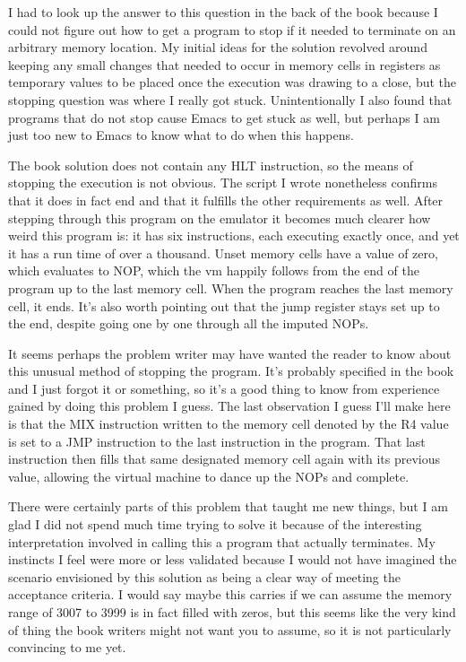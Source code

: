 \documentclass{article}
\begin{document}
I had to look up the answer to this question in the back of the book because
I could not figure out how to get a program to stop if it needed to terminate
on an arbitrary memory location. My initial ideas for the solution revolved
around keeping any small changes that needed to occur in memory cells in
registers as temporary values to be placed once the execution was drawing
to a close, but the stopping question was where I really got stuck. Unintentionally
I also found that programs that do not stop cause Emacs to get stuck as well,
but perhaps I am just too new to Emacs to know what to do when this happens.

\par

The book solution does not contain any HLT instruction, so the means of stopping
the execution is not obvious.  The script I wrote nonetheless confirms that it
does in fact end and that it fulfills the other requirements as well.  After stepping through
this program on the emulator it becomes much clearer how weird this program is:
it has six instructions, each executing exactly once, and yet it has a run time 
of over a thousand.  Unset memory cells have a value of zero, which evaluates to
NOP, which the vm happily follows from the end of the program up to the last
memory cell.  When the program reaches the last memory cell, it ends.  It's also
worth pointing out that the jump register stays set up to the end, despite going
one by one through all the imputed NOPs.

\par

It seems perhaps the problem writer may have wanted the reader to know about this 
unusual method of stopping the program.  It's probably specified in the book and
I just forgot it or something, so it's a good thing to know from experience gained
by doing this problem I guess.  The last observation I guess I'll make here is
that the MIX instruction written to the memory cell denoted by the R4 value is set
to a JMP instruction to the last instruction in the program.  That last instruction 
then fills that same designated memory cell again with its previous value, allowing
the virtual machine to dance up the NOPs and complete.

\par

There were certainly parts of this problem that taught me new things, but I am glad I
did not spend much time trying to solve it because of the interesting interpretation
involved in calling this a program that actually terminates.  My instincts I feel
were more or less validated because I would not have imagined the scenario envisioned
by this solution as being a clear way of meeting the acceptance criteria.  I would say
maybe this carries if we can assume the memory range of 3007 to 3999 is in fact filled
with zeros, but this seems like the very kind of thing the book writers might not want
you to assume, so it is not particularly convincing to me yet.
\end{document}
